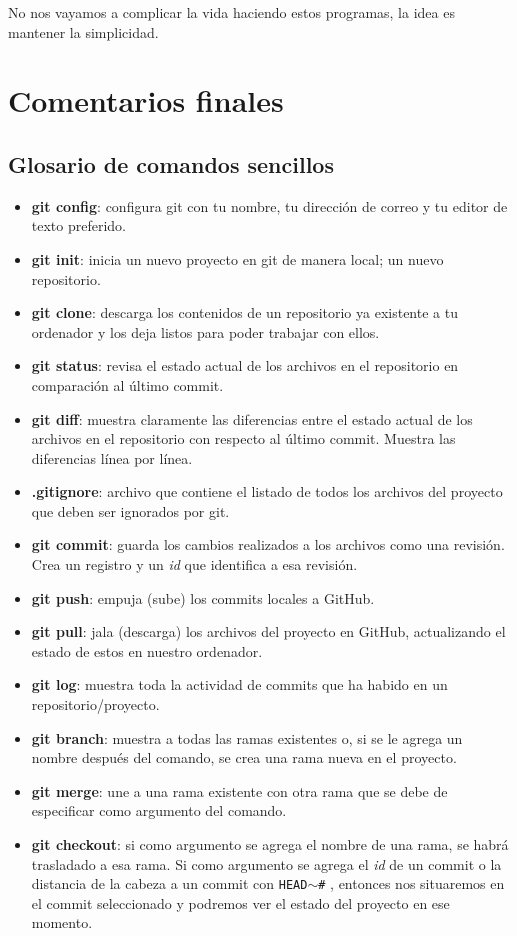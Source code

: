 \documentclass[10pt,letterpaper]{article}
\newcommand{\inlinecode}[1]{
\colorbox{light-gray}{\texttt{#1}}
}
\begin{document}
No nos vayamos a complicar la vida haciendo estos programas, la idea es mantener la simplicidad. 

\section{Comentarios finales}

\newpage

\subsection{Glosario de comandos sencillos}
\begin{small}
\begin{itemize}
\item \textbf{git config}: configura git con tu nombre, tu direcci\'on de correo y tu editor de texto preferido.
\item \textbf{git init}: inicia un nuevo proyecto en git de manera local; un nuevo repositorio.
\item \textbf{git clone}: descarga los contenidos de un repositorio ya existente a tu ordenador y los deja listos para poder trabajar con ellos.
\item \textbf{git status}: revisa el estado actual de los archivos en el repositorio en comparaci\'on al \'ultimo commit.
\item \textbf{git diff}: muestra claramente las diferencias entre el estado actual de los archivos en el repositorio con respecto al \'ultimo commit. Muestra las diferencias l\'inea por l\'inea.
\item \textbf{.gitignore}: archivo que contiene el listado de todos los archivos del proyecto que deben ser ignorados por git.
\item \textbf{git commit}: guarda los cambios realizados a los archivos como una revisi\'on. Crea un registro y un \emph{id} que identifica a esa revisi\'on.
\item \textbf{git push}: empuja (sube) los commits locales a GitHub.
\item \textbf{git pull}: jala (descarga) los archivos del proyecto en GitHub, actualizando el estado de estos en nuestro ordenador.
\item \textbf{git log}: muestra toda la actividad de commits que ha habido en un repositorio/proyecto.
\item \textbf{git branch}: muestra a todas las ramas existentes o, si se le agrega un nombre despu\'es del comando, se crea una rama nueva en el proyecto.
\item \textbf{git merge}: une a una rama existente con otra rama que se debe de especificar como argumento del comando.
\item \textbf{git checkout}: si como argumento se agrega el nombre de una rama, se habr\'a trasladado a esa rama. Si como argumento se agrega el \emph{id} de un commit o la distancia de la cabeza a un commit con \inlinecode{HEAD$\sim$\#}, entonces nos situaremos en el commit seleccionado y podremos ver el estado del proyecto en ese momento.
\end{itemize}
\end{small}
\end{document}
